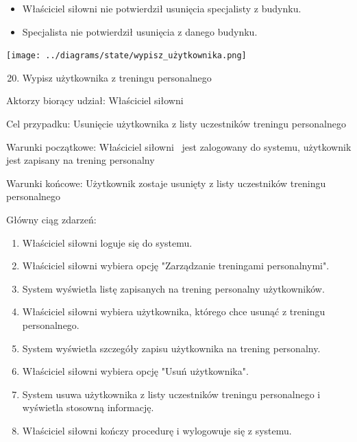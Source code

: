 \begin{itemize}
\tightlist
\item
  {Właściciel siłowni nie potwierdził usunięcia specjalisty z budynku.}
\item
  {Specjalista nie potwierdził usunięcia z danego budynku.\\
  }
\end{itemize}

{}

{}

{}

{\texttt{[image: ../diagrams/state/wypisz\_użytkownika.png]}}

\begin{enumerate}
\setcounter{enumi}{19}
\tightlist
\item
  {Wypisz użytkownika z treningu personalnego}
\end{enumerate}

{Aktorzy biorący udział: Właściciel siłowni}

{Cel przypadku: Usunięcie użytkownika z listy uczestników treningu
personalnego}

{Warunki początkowe: Właściciel siłowni ~jest zalogowany do systemu,
użytkownik jest zapisany na trening personalny}

{Warunki końcowe: Użytkownik zostaje usunięty z listy uczestników
treningu personalnego}

{Główny ciąg zdarzeń:}

\begin{enumerate}
\tightlist
\item
  {Właściciel siłowni loguje się do systemu.}
\item
  {Właściciel siłowni wybiera opcję "Zarządzanie treningami
  personalnymi".}
\item
  {System wyświetla listę zapisanych na trening personalny
  użytkowników.}
\item
  {Właściciel siłowni wybiera użytkownika, którego chce usunąć z
  treningu personalnego.}
\item
  {System wyświetla szczegóły zapisu użytkownika na trening personalny.}
\item
  {Właściciel siłowni wybiera opcję "Usuń użytkownika".}
\item
  {System usuwa użytkownika z listy uczestników treningu personalnego i
  wyświetla stosowną informację.}
\item
  {Właściciel siłowni kończy procedurę i wylogowuje się z systemu.}
\end{enumerate}

